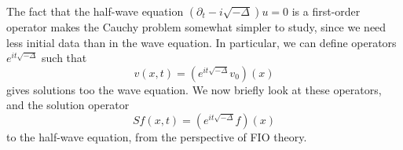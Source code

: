 \documentclass{article}
\theoremstyle{plain}
\theoremstyle{remark}
\theoremstyle{definition}
\begin{document}
The fact that the half-wave equation $(\partial_t - i \sqrt{-\Delta}) u = 0$ is a first-order operator makes the Cauchy problem somewhat simpler to study, since we need less initial data than in the wave equation. In particular, we can define operators $e^{it \sqrt{-\Delta}}$ such that
%
\[ v(x,t) = (e^{i t \sqrt{-\Delta}} v_0)(x) \]
%
gives solutions too the wave equation. We now briefly look at these operators, and the solution operator
%
\[ Sf(x,t) = (e^{i t \sqrt{-\Delta}} f)(x) \]
%
to the half-wave equation, from the perspective of FIO theory.

\begin{comment}

Fourier transform of e^{-|x|} is

	c_d (1 + |xi|^2)^{- (d+1) / 2}

Fourier transform of e^{- lambda |x|} for lambda > 0 is

	int e^{- lambda |x|} e^{-i xi * x} dx
	= c_d lambda^{-d} (1 + |xi|^2 / lambda^2)^{-(d+1)/2}

Can we now apply analytic continuation to conclude that
the Fourier transform of e^{-it |x|} is equal to

	c_d (it)^{-d} ( 1 + |xi|^2 / (it + 0)^2 )^{-(d+1)/2}

where we take the branch of the square root that is the analytic extension
away of the normal square root away, defined away from the imaginary axis.

Then for |xi| > t this quantity is equal to

	c_d i t^{-d} ( |xi|^2 / t^2 - 1 )^{-(d+1)/2}

e^{-i pi / 2}

sqrt( a e^{it} ) = sqrt(a) sqrt(e^{it/2})

\end{comment}

\begin{comment}

Let's start with the operators $\{ e^{it \sqrt{-\Delta}} \}$. We can write
%
\begin{align*}
	e^{i t \sqrt{-\Delta}} f(x) &= \int e^{2 \pi i (t |\xi| + \xi \cdot x)} \widehat{f}(\xi)\; d\xi\\
	&= \int e^{2 \pi i (t |\xi| + \xi \cdot (x - y))} f(y)\; dy\; d\xi\\
	&= \int a(x,y,\xi) e^{2 \pi i \phi_t(x,y,\xi)} f(y)\; dy\; d\xi,
\end{align*}
%
where $a(x,y,\xi) = 1$, and $\phi_t(x,y,\xi) = t |\xi| + \xi \cdot (x - y)$. The function $a$ is a symbol of order zero, and the function $\phi_t$ is a non-degenerate phase function with canonical relation defined by the equations
%
\[ \left\{ x = y + t \frac{\xi}{|\xi|}\ \text{and}\ \xi = \eta \right\}, \]
%
which, for a fixed $y$, we can think of as consisting of the sphere of radius $t$ at $y$, and all \emph{outward} pointing cotangent vectors on this sphere. Thus the operators $e^{it \sqrt{-\Delta}}$ are Fourier integrals of order $0$.

\end{comment}
\end{document}
